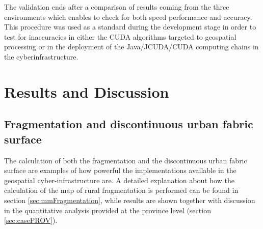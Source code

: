 \documentclass[APA,LATO1COL,doublespace]{WileyNJD-v2}
\newcommand{\toberevised}[1]{\emph{\textcolor{red}{#1}}} %
\begin{document}
The validation ends after a comparison of results coming from the three environments which enables to check for both speed performance and accuracy. 
This procedure was used as a standard during the development stage in order to test for inaccuracies in either the CUDA algorithms targeted to geospatial processing or in the deployment of the Java/JCUDA/CUDA computing chains in the cyberinfrastructure.

\section{ Results and Discussion } %
\label{sec:results}





\subsection{ Fragmentation and discontinuous urban fabric surface }
\label{sec:resFRAG_DUF}
The calculation of both the fragmentation and the discontinuous urban fabric surface are examples of how powerful the implementations available in the geospatial cyber-infrastructure are.
A detailed explanation about how the calculation of the map of rural fragmentation is performed can be found in section \ref{sec:mmFragmentation}, while results are shown
 together with discussion
in the quantitative analysis provided at the province level (section \ref{sec:casePROV}).%
\end{document}
